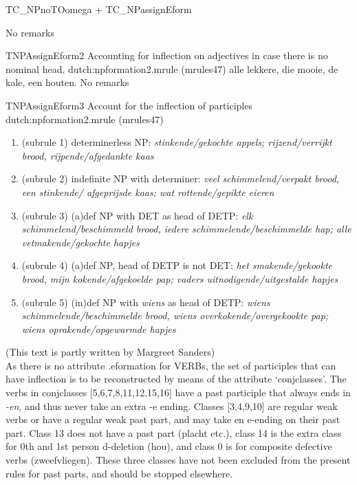 \begin{mruleclass}{TC\_NPnoTOomega + TC\_NPassignEform}
\begin{members}
\begin{member}
\remarks No remarks
\end{member}
\begin{member}
 TNPAssignEform2
 Accounting for inflection 
on adjectives in case there is no nominal 
head.
\file dutch:npformation2.mrule (mrules47)
\semantics \nosemantics
\example alle lekkere, die mooie, de kale, een houten. 
\remarks  No remarks
\end{member}
\begin{member}
 TNPAssignEform3
 Account for the inflection of participles
\file dutch:npformation2.mrule (mrules47)
\semantics \nosemantics
\example \mbox{}\\
\begin{enumerate} 
  \item
(subrule 1) determinerless NP: 
{\em stinkende/gekochte appels; rijzend/verrijkt brood, 
rijpende/afgedankte kaas}
  \item
(subrule 2) indefinite NP with determiner: 
{\em veel schimmelend/verpakt brood, een stinkende/
afgeprijsde kaas; wat rottende/gepikte eieren}
  \item
(subrule 3) (a)def NP with DET as head of DETP: 
{\em elk schimmelend/beschimmeld brood, iedere 
schimmelende/beschimmelde hap; alle vetmakende/gekochte hapjes}
  \item
(subrule 4) (a)def NP, head of DETP is not DET: 
{\em het smakende/gekookte brood, 
mijn kokende/afgekoelde pap; vaders uitnodigende/uitgestalde hapjes}
  \item
(subrule 5) (in)def NP with {\em wiens} as head of DETP: 
{\em wiens schimmelende/beschimmelde brood, wiens 
overkokende/overgekookte pap; wiens oprakende/opgewarmde hapjes}
\end{enumerate}





\remarks 
\begin{enumerate}
(This text is partly written by Margreet Sanders)\\
As there is no attribute .eformation for VERBs, the set of participles 
that can have inflection is to be reconstructed by means of the attribute
`conjclasses'. The verbs in conjclasses [5,6,7,8,11,12,15,16] have a past 
participle that always ends in {\em -en\/}, and thus never take an extra -e
ending. Classes [3,4,9,10] are regular weak verbs or have a regular weak past 
part, and may take en e-ending on their past part. Class 13 does not have a 
past part (placht etc.), class 14 is the extra
class for 0th and 1st person d-deletion (hou), and class 0 is for composite 
defective verbs (zweefvliegen). These three classes have not been excluded from
the present rules for past parts, and should be stopped elsewhere. 


\end{enumerate}
\end{member}
\end{members}
\end{mruleclass}

